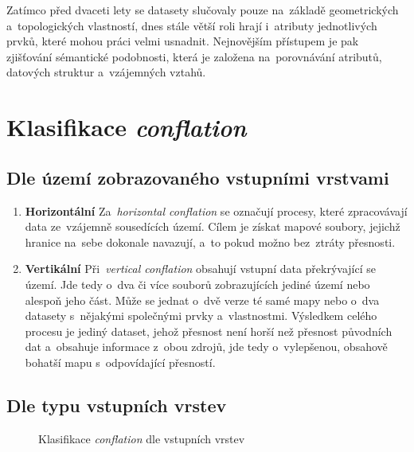 Zatímco před dvaceti lety se datasety slučovaly pouze na~základě geometric\-kých 
a~topologických vlastností, dnes stále větší roli hrají i~atributy jednotlivých 
prvků, které mohou práci velmi usnadnit. Nejnovějším přístupem je pak zjišťování 
sémantické podobnosti, která je založena na~porovnávání atributů, datových 
struktur a~vzájemných vztahů.


\section{Klasifikace \textit{conflation}}
\label{klasifikace}

\subsection{Dle území zobrazovaného vstupními vrstvami}
\label{dle-uzemi}
\nopagebreak
\begin{enumerate}
  \item \textbf{Horizontální} 
    \subitem Za~\textit{horizontal conflation} se označují procesy, které 
	zpracovávají data ze~vzájemně sousedících území. Cílem je získat 
	mapové soubory, jejichž hranice na~sebe dokonale navazují, a~to pokud 
	možno bez~ztráty přesnosti.
  \item \textbf{Vertikální} \nopagebreak
    \subitem Při~\textit{vertical conflation} obsahují vstupní data překrývající
	se území. Jde tedy o~dva či více souborů zobrazujících jediné území nebo
	alespoň jeho část. Může se jednat o~dvě verze té samé mapy nebo 
	o~dva datasety s~nějakými společnými prvky a~vlastnostmi. Výsledkem 
	celého procesu je jediný dataset, jehož přesnost není horší než přesnost
	původních dat a~obsahuje informace z~obou zdrojů, jde tedy o~vylepšenou, 
	obsahově bohatší mapu s~odpovídající přesností. 
\end{enumerate}

\subsection{Dle typu vstupních vrstev}
\label{dle-vstupu}

  \begin{figure}[H]
    \centering
      \small
      
      \caption{Klasifikace \textit{conflation} dle vstupních vrstev}
      \label{fig:classification}
  \end{figure}

